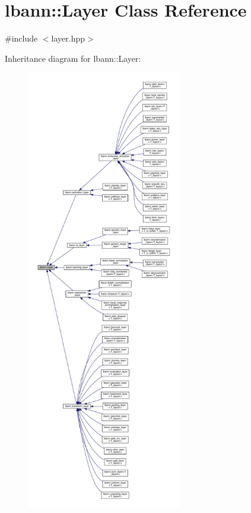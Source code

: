 \hypertarget{classlbann_1_1Layer}{}\section{lbann\+:\+:Layer Class Reference}
\label{classlbann_1_1Layer}


{\ttfamily \#include $<$layer.\+hpp$>$}



Inheritance diagram for lbann\+:\+:Layer\+:\nopagebreak
\begin{figure}[H]
\begin{center}
\leavevmode
\includegraphics[height=550pt]{classlbann_1_1Layer__inherit__graph}
\end{center}
\end{figure}


